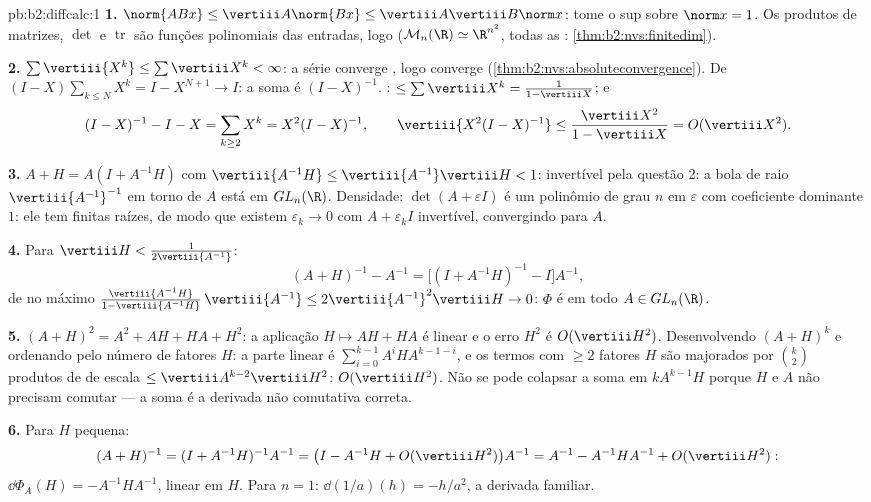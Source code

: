\begin{solution}{pb:b2:diffcalc:1}
\textbf{1.} $\norm{ABx} \leq \vertiii A\norm{Bx} \leq
\vertiii A\vertiii B\norm x$: tome o sup sobre $\norm x = 1$.
Os produtos de matrizes, $\det$ e $\operatorname{tr}$ são funções
polinomiais das entradas, logo  ($\mathcal M_n(\R)
\simeq \R^{n^2}$, todas as :
\cref{thm:b2:nvs:finitedim}).

\textbf{2.} $\sum\vertiii{X^k} \leq \sum\vertiii X^k <
\infty$: a série converge , logo converge
(\cref{thm:b2:nvs:absoluteconvergence}). De $(I -
X)\sum_{k\leq N}X^k = I - X^{N+1} \to I$: a soma é $(I -
X)^{-1}$. : $\leq \sum\vertiii X^k = \frac{1}{1 -
\vertiii X}$; e
\[
(I - X)^{-1} - I - X = \sum_{k\geq2}X^k = X^2(I - X)^{-1},
\qquad
\vertiii{X^2(I-X)^{-1}} \leq
\frac{\vertiii X^2}{1 - \vertiii X} = O(\vertiii X^2).
\]

\textbf{3.} $A + H = A(I + A^{-1}H)$ com $\vertiii{A^{-1}H}
\leq \vertiii{A^{-1}}\vertiii H < 1$: invertível pela questão 2:
a bola  de raio $\vertiii{A^{-1}}^{-1}$ em torno de $A$ está
em $GL_n(\R)$. Densidade: $\det(A + \varepsilon I)$ é um polinômio de grau $n$
em $\varepsilon$ com coeficiente dominante $1$: ele tem
finitas raízes, de modo que existem $\varepsilon_k \to 0$
com $A + \varepsilon_kI$ invertível, convergindo para $A$.

\textbf{4.} Para $\vertiii H < \frac{1}{2\vertiii{A^{-1}}}$:
\[
(A + H)^{-1} - A^{-1}
= \bigl[(I + A^{-1}H)^{-1} - I\bigr]A^{-1},
\]
de  no máximo $\frac{\vertiii{A^{-1}H}}{1 -
\vertiii{A^{-1}H}}\,\vertiii{A^{-1}} \leq
2\vertiii{A^{-1}}^2\vertiii H \to 0$: $\Phi$ é  em
todo $A \in GL_n(\R)$.

\textbf{5.} $(A+H)^2 = A^2 + AH + HA + H^2$: a aplicação $H
\mapsto AH + HA$ é linear e o erro $H^2$ é
$O(\vertiii H^2)$. Desenvolvendo $(A + H)^k$ e ordenando pelo
número de fatores $H$: a parte linear é
$\sum_{i=0}^{k-1}A^iHA^{k-1-i}$, e os termos com $\geq 2$
fatores $H$ são majorados por $\binom k2$ produtos de 
de escala $\leq \vertiii A^{k-2}\vertiii H^2$: $O(\vertiii H^2)$.
Não se pode colapsar a soma em $kA^{k-1}H$ porque $H$ e $A$
não precisam comutar --- a soma é a derivada não comutativa
correta.

\textbf{6.} Para $H$ pequena:
\[
(A+H)^{-1} = (I + A^{-1}H)^{-1}A^{-1}
= \bigl(I - A^{-1}H + O(\vertiii H^2)\bigr)A^{-1}
= A^{-1} - A^{-1}HA^{-1} + O(\vertiii H^2) :
\]
$\dd\Phi_A(H) = -A^{-1}HA^{-1}$, linear em $H$. Para $n = 1$:
$\dd(1/a)(h) = -h/a^2$, a derivada familiar.


\end{solution}
